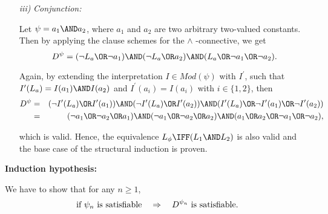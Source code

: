 {\begin{enumerate}
	Similar as above, we have to introduce a new interpretation $I^{\prime }$
	for $L_{a}$, such that $I^{\prime }(L_{a})=\lnot I(a)$ and $I^{\prime
	}(a)=I(a)$. Thus, we get%
	\begin{eqnarray*}
	D^{\psi } &=&(\lnot I^{\prime }(L_{a})\OR\lnot I^{\prime }(a))\AND(I^{\prime
	}(L_{a})\OR I^{\prime }(a)) \\
	&=&(\lnot \lnot a\OR\lnot a)\AND(\lnot a\OR a),
	\end{eqnarray*}%
	which in turn is again a tautology. Hence, the equivalence $L_{\phi }\IFF%
	\lnot L_{1}$ for negation is also valid.
	
	\item[\textit{iii)}] \textsl{Conjunction:}
	
	Let $\psi =a_{1}\AND a_{2}$, where $a_{1}$ and $a_{2}$ are two arbitrary
	two-valued constants. Then by applying the clause schemes for the $\wedge $%
	-connective, we get%
	\begin{equation*}
	D^{\psi }=(\lnot L_{a}\OR\lnot a_{1})\AND(\lnot L_{a}\OR a_{2})\AND(L_{a}\OR%
	\lnot a_{1}\OR\lnot a_{2}).
	\end{equation*}
	
	Again, by extending the interpretation $I\in Mod(\psi )$ with $I^{\prime }$,
	such that $I^{\prime }(L_{a})=I(a_{1})\AND I(a_{2})$ and $I^{\prime
	}(a_{i})=I(a_{i})$ with $i\in \{1,2\}$, then%
	\begin{eqnarray*}
	D^{\psi } &=&(\lnot I^{\prime }(L_{a})\OR I^{\prime }(a_{1}))\AND(\lnot
	I^{\prime }(L_{a})\OR I^{\prime }(a_{2}))\AND(I^{\prime }(L_{a})\OR\lnot
	I^{\prime }(a_{1})\OR\lnot I^{\prime }(a_{2})) \\
	&=&(\lnot a_{1}\OR\lnot a_{2}\OR a_{1})\AND(\lnot a_{1}\OR\lnot a_{2}\OR %
	a_{2})\AND(a_{1}\OR a_{2}\OR\lnot a_{1}\OR\lnot a_{2}),
	\end{eqnarray*}
	
	which is valid. Hence, the equivalence $L_{\phi }\IFF(L_{1}\AND L_{2})$ is
	also valid and the base case of the structural induction is proven.
	\end{enumerate}
	
	\medskip
	
	\textbf{Induction hypothesis:}
	
	\medskip
	
	We have to show that for any $n\geq 1$,%
	\begin{equation*}
	\text{if }\psi _{n}\text{ is satisfiable\quad }\Rightarrow \text{\quad }%
	D^{\psi _{n}}\text{ is satisfiable.}
	\end{equation*}
	
}
